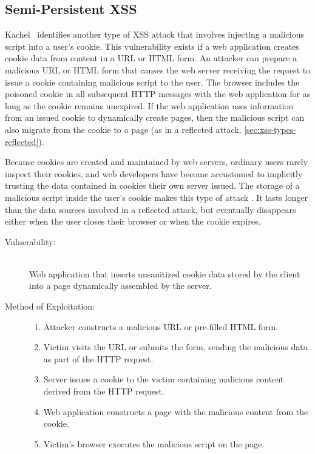 
\subsection{Semi-Persistent XSS}\label{sec:xss-types-semipersistent}

Kachel~\cite{semipersistent} identifies another type of XSS attack that involves injecting a malicious script into a user's cookie.
This vulnerability exists if a web application creates cookie data from content in a URL or HTML form.
An attacker can prepare a malicious URL or HTML form that causes the web server receiving the request to issue a cookie containing malicious script to the user.
The browser includes the poisoned cookie in all subsequent HTTP messages with the web application for as long as the cookie remains unexpired.
If the web application uses information from an issued cookie to dynamically create pages, then the malicious script can also migrate from the cookie to a page (as in a reflected attack, \autoref{sec:xss-types-reflected}).

Because cookies are created and maintained by web servers, ordinary users rarely inspect their cookies, and web developers have become accustomed to implicitly trusting the data contained in cookies their own server issued.
The storage of a malicious script inside the user's cookie makes this type of attack .
It lasts longer than the data sources involved in a reflected attack, but eventually disappears either when the user closes their browser or when the cookie expires.

\begin{description}
 \item[Vulnerability:] \hfill \\
   Web application that inserts unsanitized cookie data stored by the client into a page dynamically assembled by the server.
 \item[Method of Exploitation:] \hfill
  \begin{enumerate}
   \item Attacker constructs a malicious URL or pre-filled HTML form.
   \item Victim visits the URL or submits the form, sending the malicious data as part of the HTTP request.
   \item Server issues a cookie to the victim containing malicious content derived from the HTTP request.
   \item Web application constructs a page with the malicious content from the cookie.
   \item Victim's browser executes the malicious script on the page.
  \end{enumerate}
\end{description}

